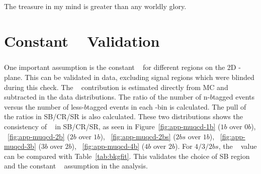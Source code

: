 \begin{savequote}[75mm]
The treasure in my mind is greater than any worldly glory.   
\end{savequote}
\chapter{Constant \muqcd~ Validation}
\label{AppendixMuqcd}

\paragraph{}
One important assumption is the constant \muqcd~ for different regions on the 2D \mleadJ-\msublJ plane. 
This can be validated in data, excluding signal regions which were blinded during this check. 
The \ttbar~ contribution is estimated directly from MC and subtracted in the data distributions. 
The ratio of the number of n-$b$tagged events versus the number of less-$b$tagged events in each \mleadJ-\msublJ bin is calculated.
The pull of the ratios in SB/CR/SR is also calculated.
These two distributions shows the consistency of \muqcd~ in SB/CR/SR, as seen in Figure~\ref{fig:app-muqcd-1b} ($1b$ over $0b$), ~\ref{fig:app-muqcd-2b} ($2b$ over $1b$), ~\ref{fig:app-muqcd-2bs} ($2bs$ over $1b$), ~\ref{fig:app-muqcd-3b} ($3b$ over $2b$), ~\ref{fig:app-muqcd-4b} ($4b$ over $2b$). For $4/3/2bs$, the \muqcd~ value can be compared with Table~\ref{tab:bkgfit}.
This validates the choice of SB region and the constant \muqcd~ assumption in the analysis.


